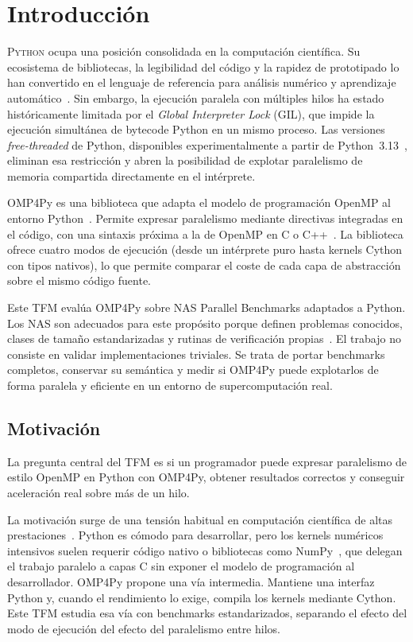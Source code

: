 \chapter{Introducción}
\label{chap:introduccion}

\lettrine{P}{ython} ocupa una posición consolidada en la computación científica.
Su ecosistema de bibliotecas, la legibilidad del código y la rapidez de
prototipado lo han convertido en el lenguaje de referencia para análisis
numérico y aprendizaje automático~\cite{HighPerfPython2020}. Sin embargo, la
ejecución paralela con múltiples hilos ha estado históricamente limitada por el
\emph{Global Interpreter Lock} (GIL), que impide la ejecución simultánea de
bytecode Python en un mismo proceso. Las versiones \emph{free-threaded} de Python, disponibles
experimentalmente a partir de Python~3.13~\cite{PEP703}, eliminan esa
restricción y abren la posibilidad de explotar paralelismo de memoria compartida
directamente en el intérprete.

OMP4Py es una biblioteca que adapta el modelo de programación OpenMP al entorno
Python~\cite{PineiroOMP4PyFGCS2026,PineiroOMP4PyCGO2026}. Permite expresar
paralelismo mediante directivas integradas en el código, con una sintaxis próxima
a la de OpenMP en C o C++~\cite{OpenMPSpec}. La biblioteca ofrece cuatro modos
de ejecución (desde un intérprete puro hasta kernels Cython con tipos
nativos), lo que permite comparar el coste de cada capa de abstracción sobre
el mismo código fuente.

Este TFM evalúa OMP4Py sobre NAS Parallel Benchmarks adaptados a Python. Los
NAS son adecuados para este propósito porque definen problemas conocidos, clases
de tamaño estandarizadas y rutinas de verificación propias~\cite{NPB1994}. El
trabajo no consiste en validar implementaciones triviales. Se trata de portar
benchmarks completos, conservar su semántica y medir si OMP4Py puede explotarlos
de forma paralela y eficiente en un entorno de supercomputación real.


\section{Motivación}
\label{sec:motivacion}

La pregunta central del TFM es si un programador puede expresar paralelismo de
estilo OpenMP en Python con OMP4Py, obtener resultados correctos y conseguir
aceleración real sobre más de un hilo.

La motivación surge de una tensión habitual en computación científica de altas
prestaciones~\cite{IntrotoHPC2010}. Python es cómodo para desarrollar, pero los
kernels numéricos intensivos suelen requerir código nativo o bibliotecas como
NumPy~\cite{NumPy2020}, que delegan el trabajo paralelo a capas C sin exponer el
modelo de programación al desarrollador. OMP4Py propone una vía
intermedia. Mantiene una interfaz Python y, cuando el rendimiento lo exige,
compila los kernels mediante Cython. Este TFM estudia esa vía con benchmarks
estandarizados, separando el efecto del modo de ejecución del efecto del
paralelismo entre hilos.

